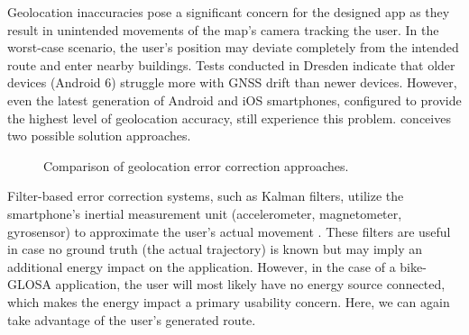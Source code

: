 Geolocation inaccuracies pose a significant concern for the designed app as they result in unintended movements of the map's camera tracking the user. In the worst-case scenario, the user's position may deviate completely from the intended route and enter nearby buildings. Tests conducted in Dresden indicate that older devices (Android 6) struggle more with GNSS drift than newer devices. However, even the latest generation of Android and iOS smartphones, configured to provide the highest level of geolocation accuracy, still experience this problem.  conceives two possible solution approaches.

\begin{figure}[htbp]
\centering
{}
\caption{Comparison of geolocation error correction approaches.}
\label{fig:battery-efficient-gps-error-correction}
\end{figure}

Filter-based error correction systems, such as Kalman filters, utilize the smartphone's inertial measurement unit (accelerometer, magnetometer, gyrosensor) to approximate the user's actual movement \cite{US20200049837A1}. These filters are useful in case no ground truth (the actual trajectory) is known but may imply an additional energy impact on the application. However, in the case of a bike-GLOSA application, the user will most likely have no energy source connected, which makes the energy impact a primary usability concern. Here, we can again take advantage of the user's generated route.

